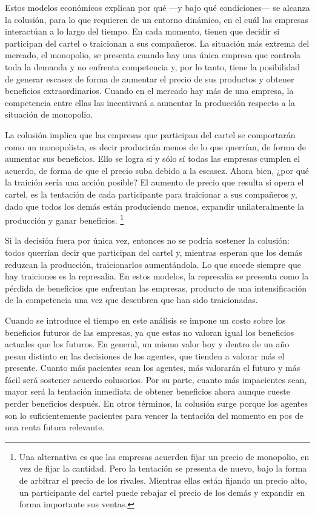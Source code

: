 \documentclass[
  12pt,
  spanish,
]{book}
\begin{document}
Estos modelos económicos explican por qué ---y bajo qué condiciones--- se alcanza la colusión, para lo que requieren de un entorno dinámico, en el cuál las empresas interactúan a lo largo del tiempo. En cada momento, tienen que decidir si participan del cartel o traicionan a sus compañeros. La situación más extrema del mercado, el monopolio, se presenta cuando hay una única empresa que controla toda la demanda y no enfrenta competencia y, por lo tanto, tiene la posibilidad de generar escasez de forma de aumentar el precio de sus productos y obtener beneficios extraordinarios. Cuando en el mercado hay más de una empresa, la competencia entre ellas las incentivará a aumentar la producción respecto a la situación de monopolio.

La colusión implica que las empresas que participan del cartel se comportarán como un monopolista, es decir producirán menos de lo que querrían, de forma de aumentar sus beneficios. Ello se logra si y sólo sí todas las empresas cumplen el acuerdo, de forma de que el precio suba debido a la escasez. Ahora bien, ¿por qué la traición sería una acción posible? El aumento de precio que resulta si opera el cartel, es la tentación de cada participante para traicionar a sus compañeros y, dado que todos los demás están produciendo menos, expandir unilateralmente la producción y ganar beneficios.
\footnote{Una alternativa es que las empresas acuerden fijar un precio de monopolio, en vez de fijar la cantidad. Pero la tentación se presenta de nuevo, bajo la forma de arbitrar el precio de los rivales. Mientras ellas están fijando un precio alto, un participante del cartel puede rebajar el precio de los demás y expandir en forma importante sus ventas.}

Si la decisión fuera por única vez, entonces no se podría sostener la colusión: todos querrían decir que participan del cartel y, mientras esperan que los demás reduzcan la producción, traicionarlos aumentándola. Lo que sucede siempre que hay traiciones es la represalia. En estos modelos, la represalia se presenta como la pérdida de beneficios que enfrentan las empresas, producto de una intensificación de la competencia una vez que descubren que han sido traicionadas.

Cuando se introduce el tiempo en este análisis se impone un costo sobre los beneficios futuros de las empresas, ya que estas no valoran igual los beneficios actuales que los futuros. En general, un mismo valor hoy y dentro de un
año pesan distinto en las decisiones de los agentes, que tienden a valorar más el presente. Cuanto más pacientes sean los agentes, más valorarán el futuro y más fácil será sostener acuerdo colusorios. Por su parte, cuanto más impacientes sean, mayor será la tentación inmediata de obtener beneficios ahora aunque cueste perder beneficios después. En otros términos, la colusión surge porque los agentes son lo suficientemente pacientes para vencer la tentación del momento en pos de una renta futura relevante.
\end{document}

